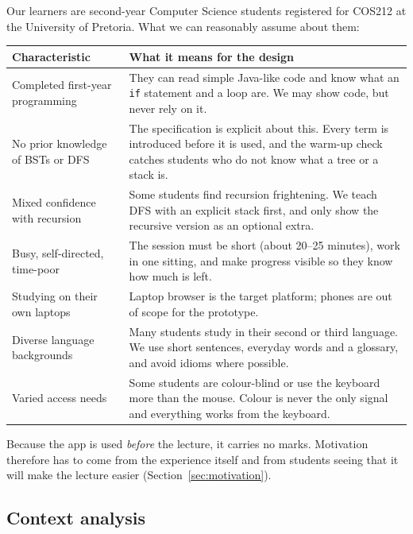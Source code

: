 \documentclass[11pt,a4paper]{article}
\newcommand{\code}[1]{\texttt{#1}}
\begin{document}
Our learners are second-year Computer Science students registered for COS212 at the University of
Pretoria. What we can reasonably assume about them:

\begin{longtable}{@{}p{4.2cm} p{10.6cm}@{}}
  \toprule
  \textbf{Characteristic} & \textbf{What it means for the design} \\
  \midrule
  \endhead
  Completed first-year programming & They can read simple Java-like code and know what an
      \code{if} statement and a loop are. We may show code, but never rely on it. \\
  No prior knowledge of BSTs or DFS & The specification is explicit about this. Every term is
      introduced before it is used, and the warm-up check catches students who do not know what
      a tree or a stack is. \\
  Mixed confidence with recursion & Some students find recursion frightening. We teach DFS with an
      explicit stack first, and only show the recursive version as an optional extra. \\
  Busy, self-directed, time-poor & The session must be short (about 20--25 minutes), work in
      one sitting, and make progress visible so they know how much is left. \\
  Studying on their own laptops & Laptop browser is the target platform; phones are out of scope
      for the prototype. \\
  Diverse language backgrounds & Many students study in their second or third language. We use
      short sentences, everyday words and a glossary, and avoid idioms where possible. \\
  Varied access needs & Some students are colour-blind or use the keyboard more than the mouse.
      Colour is never the only signal and everything works from the keyboard. \\
  \bottomrule
\end{longtable}

Because the app is used \emph{before} the lecture, it carries no marks. Motivation therefore has to
come from the experience itself and from students seeing that it will make the lecture easier
(Section~\ref{sec:motivation}).

\subsection{Context analysis}
\end{document}
